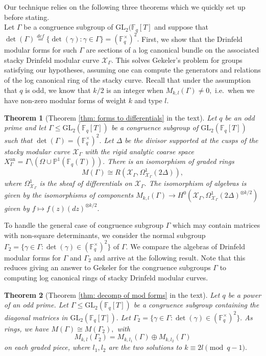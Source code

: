 \documentclass[11pt]{amsart}
\newtheorem{theorem}{Theorem}[section]
\theoremstyle{definition}
\numberwithin{equation}{section}
\newcommand{\GL}{\mathrm{GL}} 	%
\newcommand{\sX}{\mathscr{X}}		%
\newcommand{\bbF}{\mathbb{F}}		%
\newcommand{\bbP}{\mathbb{P}}		%
\begin{document}
		Our technique relies on the following three theorems which we quickly set up before stating.\\
		
		Let $\Gamma$ be a congruence subgroup of $\GL_2(\bbF_q[T]$ and suppose that
		$\displaystyle{\det(\Gamma)\overset{def}{=}\{\det(\gamma):\gamma\in \Gamma\}=(\bbF_q^{\times})^2}.$ First, we show that the Drinfeld modular forms for such $\Gamma$ are sections of a log canonical bundle on the associated stacky Drinfeld modular curve $\sX_{\Gamma}.$ This solves Gekeler's problem for groups satisfying our hypotheses, assuming one can compute the generators and relations of the log canonical ring of the stacky curve. Recall that under the assumption that $q$ is odd, we know that $k/2$ is an integer when $M_{k,l}(\Gamma)\neq 0,$ i.e.\ when we have non-zero modular forms of weight $k$ and type $l.$ 
		\begin{theorem}[Theorem \ref{thm: forms to differentials} in the text]
			Let $q$ be an odd prime and let $\Gamma\leq \GL_2(\bbF_q[T])$ be a congruence subgroup of $\GL_2(\bbF_q[T])$ such that $\det(\Gamma)=(\bbF_q^{\times})^2.$ 
			Let $\Delta$ be the divisor supported at the cusps of the stacky modular curve $\sX_{\Gamma}$ with the rigid analytic coarse space $X_{\Gamma}^{\text{an}}=\Gamma\setminus(\Omega\cup \bbP^1(\bbF_q(T))).$ 
			There is an isomorphism of graded rings \[M(\Gamma)\cong R(\sX_{\Gamma},\Omega^1_{\sX_{\Gamma}}(2\Delta)),\] where $\Omega^1_{\sX_{\Gamma}}$ is the sheaf of differentials on $\sX_{\Gamma}.$ The isomorphism of algebras is given by the isomorphisms of components $M_{k,l}(\Gamma)\to H^0(\sX_{\Gamma},\Omega^1_{\sX_{\Gamma}}(2\Delta)^{\otimes k/2})$ given by $f\mapsto f(z)(dz)^{\otimes k/2}.$ 
		\end{theorem}
		
		To handle the general case of congruence subgroup $\Gamma$ which may contain matrices with non-square determinants, we consider the normal subgroup $\Gamma_2=\{\gamma\in \Gamma: \det(\gamma)\in (\bbF_q^{\times})^2\}$ of $\Gamma.$ We compare the algebras of Drinfeld modular forms for $\Gamma$ and $\Gamma_2$ and arrive at the following result. Note that this reduces giving an answer to Gekeler for the congruence subgroups $\Gamma$ to computing log canonical rings of stacky Drinfeld modular curves.
		\begin{theorem}[Theorem \ref{thm: decomp of mod forms} in the text]
			Let $q$ be a power of an odd prime. Let $\Gamma\leq \GL_2(\bbF_q[T])$ be a congruence subgroup containing the diagonal matrices in $\GL_2(\bbF_q[T]).$ Let $\Gamma_2=\{\gamma\in \Gamma: \det(\gamma)\in (\bbF_q^{\times})^2\}.$ As rings, we have
			$M(\Gamma)\cong M(\Gamma_2),$
			with \[M_{k,l}(\Gamma_2)=M_{k,l_1}(\Gamma)\oplus M_{k,l_2}(\Gamma)\] on each graded piece, where $l_1,l_2$ are the two solutions to $k\equiv 2l\pmod{q-1}.$ 
		\end{theorem}
		
\end{document}
